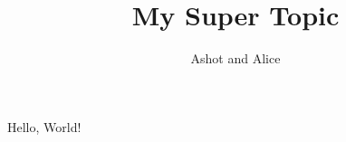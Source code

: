 \documentclass[utf8]{beamer}
\title{My Super Topic}
\author{Ashot and Alice}
\begin{document}

\begin{frame}%
\titlepage
\end{frame}

\begin{frame}%
Hello, World!
\end{frame}
\end{document}
